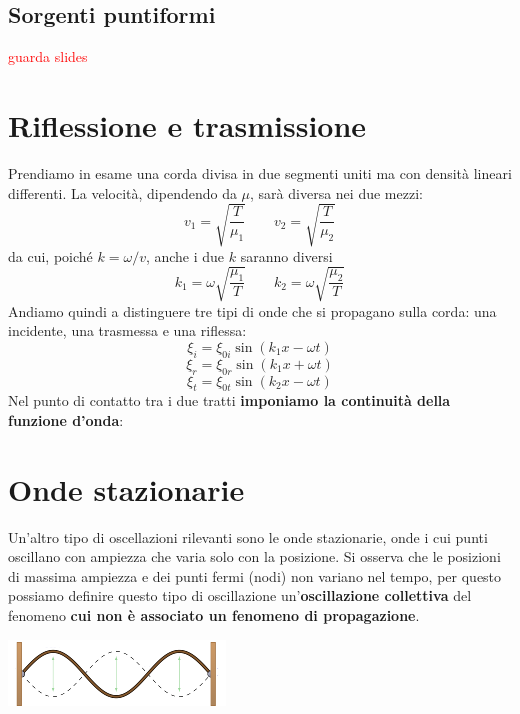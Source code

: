 \documentclass[x11names]{report}
\begin{document}
	
	\subsection{Sorgenti puntiformi}
	\begin{center}
		\textcolor{red}{guarda slides}
	\end{center}
	
	\newpage
	\section{Riflessione e trasmissione}
	Prendiamo in esame una corda divisa in due segmenti uniti ma con densità lineari differenti. La velocità, dipendendo da \(\mu\), sarà diversa nei due mezzi:
	\[ 
	v_1 = \sqrt{\frac{T}{\mu_1}} \qquad v_2 = \sqrt{\frac{T}{\mu_2}} 
	\]
	da cui, poiché \(k = \omega / v\), anche i due \(k\) saranno diversi
	\[ 
	k_1 = \omega \sqrt{\frac{\mu_1}{T}} \qquad k_2 = \omega \sqrt{\frac{\mu_2}{T}} 
	\]
	Andiamo quindi a distinguere tre tipi di onde che si propagano sulla corda: una incidente, una trasmessa e una riflessa:
	\[ 
	\xi_i = \xi_{0i}\sin\left(k_1 x - \omega t\right)
	\]
	\[ 
	\xi_r = \xi_{0r}\sin\left(k_1 x + \omega t\right)
	\]
	\[ 
	\xi_t = \xi_{0t}\sin\left(k_2 x - \omega t\right)
	\]
	Nel punto di contatto tra i due tratti \textbf{imponiamo la continuità della funzione d'onda}:
	
	
	\newpage
	\section{Onde stazionarie}
	Un'altro tipo di oscellazioni rilevanti sono le onde stazionarie, onde i cui punti oscillano con ampiezza che varia solo con la posizione. Si osserva che le posizioni di massima ampiezza e dei punti fermi (nodi) non variano nel tempo, per questo possiamo definire questo tipo di oscillazione un'\textbf{oscillazione collettiva} del fenomeno \textbf{cui non è associato un fenomeno di propagazione}. \\
	
	\begin{center}
		\includegraphics{imgs/stazionarie.png}
	\end{center}
	
\end{document}
